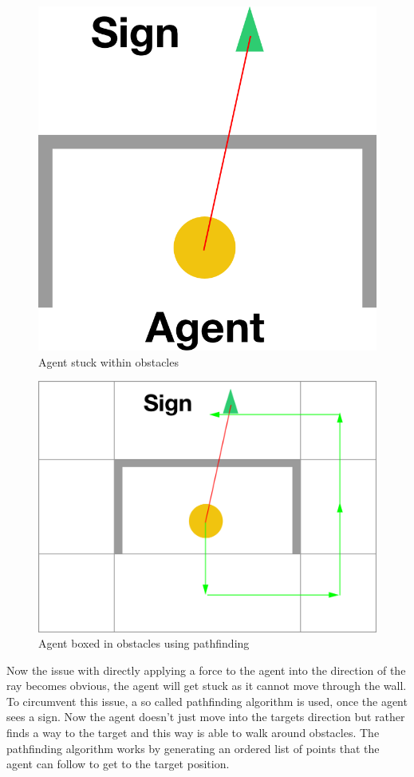 \documentclass[11pt]{article}
\begin{document}
\begin{itemize}
	\begin{minipage}{.4\textwidth}
		\begin{figure}[H]
			\centering
			\includegraphics[width=.5\linewidth]{assets/without-navmesh}\\
			Agent stuck within obstacles
		\end{figure}
	\end{minipage}
	\begin{minipage}{.2\textwidth}	
	\vfill\hfill
	\end{minipage}
	\begin{minipage}{.4\textwidth}
		\begin{figure}[H]
			\centering
			\includegraphics[width=1\linewidth]{assets/with-navmesh}\\
			Agent boxed in obstacles using pathfinding
		\end{figure}
	\end{minipage}
	
	Now the issue with directly applying a force to the agent into the direction of the ray becomes obvious, the agent will get stuck as it cannot move through the wall. To circumvent this issue, a so called pathfinding algorithm is used, once the agent sees a sign. Now the agent doesn't just move into the targets direction but rather finds a way to the target and this way is able to walk around obstacles. The pathfinding algorithm works by generating an ordered list of points that the agent can follow to get to the target position.
	

\end{itemize}
\end{document}
